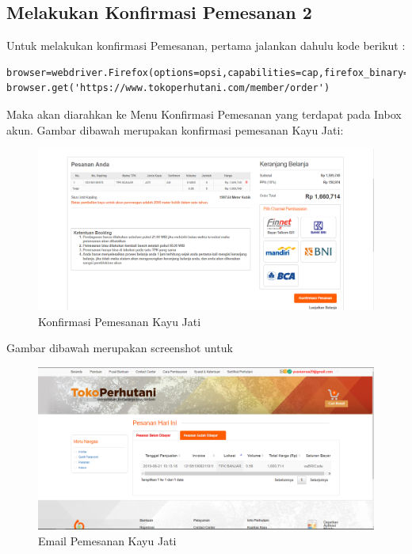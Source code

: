 \newpage
\subsection {Melakukan Konfirmasi Pemesanan 2}
Untuk melakukan konfirmasi Pemesanan, pertama jalankan dahulu kode berikut :
\begin{verbatim}
browser=webdriver.Firefox(options=opsi,capabilities=cap,firefox_binary=binary)
browser.get('https://www.tokoperhutani.com/member/order')
\end{verbatim}

Maka akan diarahkan ke Menu Konfirmasi Pemesanan yang terdapat pada Inbox akun.
Gambar dibawah merupakan konfirmasi pemesanan Kayu Jati:
\begin{figure}[h]
	\centering
	\includegraphics[scale=0.25]{figures/T6_1}
	\caption{Konfirmasi Pemesanan Kayu Jati}
\end{figure}

Gambar dibawah merupakan screenshot untuk
\begin{figure}[h]
	\centering
	\includegraphics[scale=0.25]{figures/T6_2}
	\caption{Email Pemesanan Kayu Jati}
\end{figure}


\newpage

